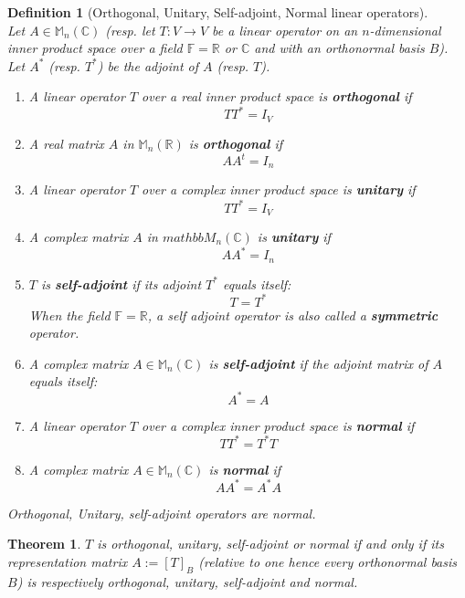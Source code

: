 \documentclass[12pt]{article}
\newtheorem{definition}{Definition}[section]
\newtheorem{theorem}{Theorem}[section]
\theoremstyle{definition}
\begin{document}
\begin{definition}[Orthogonal, Unitary, Self-adjoint, Normal linear operators]
\hfill\\\normalfont Let $A\in\mathbb{M}_n(\mathbb{C})$ (resp. let $T:V\to V$ be a linear operator on an $n$-dimensional inner product space over a field $\mathbb{F}=\mathbb{R}$ or $\mathbb{C}$ and with an orthonormal basis $B$). Let $A^\ast$ (resp. $T^\ast$) be the adjoint of $A$ (resp. $T$). 
\begin{enumerate}[label=(\arabic*)]
\item A linear operator $T$ over a real inner product space is \textbf{orthogonal} if
\[
TT^\ast = I_V
\]
\item A real matrix $A$ in $\mathbb{M}_n(\mathbb{R})$ is \textbf{orthogonal} if
\[
AA^t = I_n
\]
\item A linear operator $T$ over a complex inner product space is \textbf{unitary} if
\[
TT^\ast = I_V
\]
\item A complex matrix $A$ in $mathbb{M}_n(\mathbb{C})$ is \textbf{unitary} if
\[
AA^\ast = I_n
\]
\item $T$ is \textbf{self-adjoint} if its adjoint $T^\ast$ equals itself:
\[
T=T^\ast
\]
When the field $\mathbb{F}=\mathbb{R}$, a self adjoint operator is also called a \textbf{symmetric} operator.
\item A complex matrix $A\in\mathbb{M}_n(\mathbb{C})$ is \textbf{self-adjoint} if the adjoint matrix of $A$ equals itself:
\[
A^\ast = A
\]
\item A linear operator $T$ over a complex inner product space is \textbf{normal} if
\[
TT^\ast = T^\ast T
\]
\item A complex matrix $A\in\mathbb{M}_n(\mathbb{C})$ is \textbf{normal} if
\[
AA^\ast = A^\ast A
\]
\end{enumerate}
Orthogonal, Unitary, self-adjoint operators are normal.
\end{definition}
\begin{theorem}\normalfont $T$ is orthogonal, unitary, self-adjoint or normal if and only if its representation matrix $A:=[T]_B$ (relative to one hence every orthonormal basis $B$) is respectively orthogonal, unitary, self-adjoint and normal.
\end{theorem}
\end{document}
